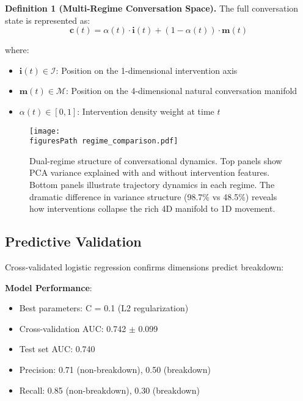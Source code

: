 \documentclass[11pt,letterpaper]{article}
\newcommand{\allFeaturesPCOne}{98.7\%}  %
\newcommand{\nonInterventionPCOneVariance}{48.5\%}  %
\newcommand{\bestRegularizationC}{0.1}
\newcommand{\cvAUCMean}{0.742}
\newcommand{\cvAUCStd}{0.099}
\newcommand{\testAUC}{0.740}
\newcommand{\precisionNonBreakdown}{0.71}
\newcommand{\precisionBreakdown}{0.50}
\newcommand{\recallNonBreakdown}{0.85}
\newcommand{\recallBreakdown}{0.30}
\newcommand{\figuresPath}{../analysis/rigorous_analysis_outputs/figures/}
\begin{document}
\textbf{Definition 1 (Multi-Regime Conversation Space).} The full conversation state is represented as:
\begin{equation}
\mathbf{c}(t) = \alpha(t) \cdot \mathbf{i}(t) + (1-\alpha(t)) \cdot \mathbf{m}(t)
\end{equation}

where:
\begin{itemize}
    \item $\mathbf{i}(t) \in \mathcal{I}$: Position on the 1-dimensional intervention axis
    \item $\mathbf{m}(t) \in \mathcal{M}$: Position on the 4-dimensional natural conversation manifold
    \item $\alpha(t) \in [0,1]$: Intervention density weight at time $t$
\end{itemize}

\begin{figure}[htbp]
\centering
\texttt{[image: \\figuresPath regime\_comparison.pdf]}
\caption{Dual-regime structure of conversational dynamics. Top panels show PCA variance explained with and without intervention features. Bottom panels illustrate trajectory dynamics in each regime. The dramatic difference in variance structure (\allFeaturesPCOne{} vs \nonInterventionPCOneVariance{}) reveals how interventions collapse the rich 4D manifold to 1D movement.}
\label{fig:regime_comparison}
\end{figure}

\subsection{Predictive Validation}

Cross-validated logistic regression confirms dimensions predict breakdown:

\textbf{Model Performance}:
\begin{itemize}
    \item Best parameters: C = \bestRegularizationC{} (L2 regularization)
    \item Cross-validation AUC: \cvAUCMean{} $\pm$ \cvAUCStd{}
    \item Test set AUC: \testAUC{}
    \item Precision: \precisionNonBreakdown{} (non-breakdown), \precisionBreakdown{} (breakdown)
    \item Recall: \recallNonBreakdown{} (non-breakdown), \recallBreakdown{} (breakdown)
\end{itemize}
\end{document}
